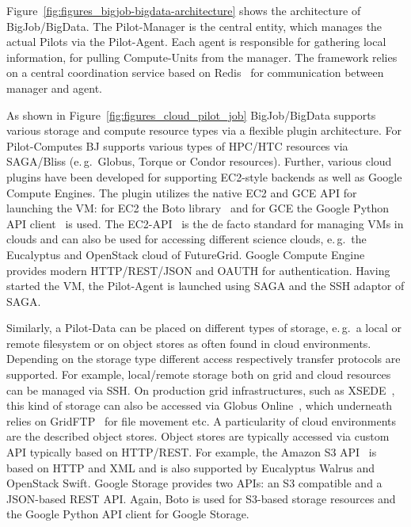 \documentclass[times]{cpeauth}
\newcommand{\jhanote}[1]{ {\textcolor{red} { ***shantenu: #1 }}}
\newcommand{\jhanote}[1]{}
\newcommand{\pilot}{Pilot\xspace}
\newcommand{\pilots}{Pilots\xspace}
\newcommand{\pilotcomputes}{Pilot-Computes\xspace}
\newcommand{\pilotdata}{Pilot-Data\xspace}
\newcommand{\computeunits}{Compute-Units\xspace}
\begin{document}
Figure~\ref{fig:figures_bigjob-bigdata-architecture} shows the architecture of
BigJob/BigData. The \pilot-Manager is the central entity, which manages the
actual \pilots via the \pilot-Agent. Each agent is responsible for gathering
local information, for pulling \computeunits from the manager. The framework
relies on a central coordination service based on Redis~\cite{redis} for
communication between manager and agent.

As shown in Figure~\ref{fig:figures_cloud_pilot_job} BigJob/BigData supports
various storage and compute resource types via a flexible plugin architecture.
For \pilotcomputes BJ supports various types of HPC/HTC resources via
SAGA/Bliss (e.\,g.\ Globus, Torque or Condor resources). Further, various
cloud plugins have been developed for supporting EC2-style backends as well as
Google Compute Engines. The plugin utilizes the native EC2 and GCE API for
launching the VM: for EC2 the Boto library~\cite{boto} and for GCE 
the Google Python API client~\cite{google-api-client} is used.
The EC2-API~\cite{amazonec2api} is the de facto standard for
managing VMs in clouds and can also be used for accessing different science
clouds, e.\,g.\ the Eucalyptus and OpenStack cloud of FutureGrid. Google
Compute Engine provides modern HTTP/REST/JSON and OAUTH for authentication.
Having started the VM, the \pilot-Agent is launched using SAGA and the SSH
adaptor of SAGA.

Similarly, a \pilotdata can be placed on different types of storage, e.\,g.\ a
local or remote filesystem or on object stores as often found in cloud
environments. Depending on the storage type different access respectively
transfer protocols are supported. For example, local/remote storage both on
grid and cloud resources can be managed via SSH. On production grid
infrastructures, such as XSEDE~\cite{xsede}, this kind of storage can also be
accessed via Globus Online~\cite{10.1109/MIC.2011.64}, which underneath relies
on GridFTP~\cite{ogf-gfd-20} for file movement etc. A particularity of cloud
environments are the described object stores. Object stores are typically
accessed via custom API typically based on HTTP/REST. For example, the Amazon
S3 API~\cite{amazons3api} is based on HTTP and XML and is also supported by
Eucalyptus Walrus and OpenStack Swift. Google Storage provides two APIs: an S3 
compatible and a JSON-based REST API. Again, Boto is used for S3-based storage 
resources and the Google Python API client for Google Storage. 

 
\end{document}
